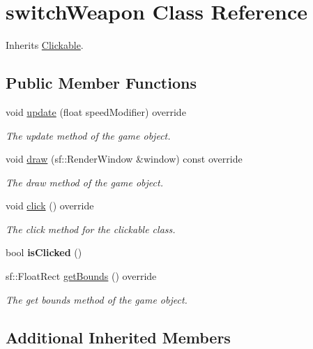 \hypertarget{classswitch_weapon}{\section{switch\+Weapon Class Reference}
\label{classswitch_weapon}
}


Inherits \hyperlink{class_clickable}{Clickable}.

\subsection*{Public Member Functions}
\begin{DoxyCompactItemize}
\item 
void \hyperlink{classswitch_weapon_a63fe71ba783dce920b6180efb2258735}{update} (float speed\+Modifier) override
\begin{DoxyCompactList}\small\item\em The update method of the game object. \end{DoxyCompactList}\item 
void \hyperlink{classswitch_weapon_a1974ebf68ea94cfeabfb2bc8b3a97b37}{draw} (sf\+::\+Render\+Window \&window) const override
\begin{DoxyCompactList}\small\item\em The draw method of the game object. \end{DoxyCompactList}\item 
void \hyperlink{classswitch_weapon_a8b848f4f3d33cadf233c693861164f29}{click} () override
\begin{DoxyCompactList}\small\item\em The click method for the clickable class. \end{DoxyCompactList}\item 
\hypertarget{classswitch_weapon_a12cbca1c7d8c181293ecb53b64c88a1b}{bool {\bfseries is\+Clicked} ()}\label{classswitch_weapon_a12cbca1c7d8c181293ecb53b64c88a1b}

\item 
sf\+::\+Float\+Rect \hyperlink{classswitch_weapon_ab6fb2ee5b59c1cfd6130eb5fd51f39ee}{get\+Bounds} () override
\begin{DoxyCompactList}\small\item\em The get bounds method of the game object. \end{DoxyCompactList}\end{DoxyCompactItemize}
\subsection*{Additional Inherited Members}


